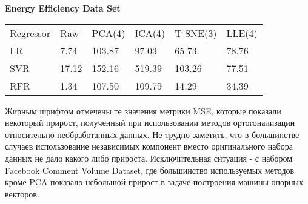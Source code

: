 \documentclass[runningheads]{llncs}
\begin{document}
\textbf{Energy Efficiency Data Set}
\begin{table}[H]
\begin{tabular}{llllll}
Regressor                 & Raw  & PCA(4) & ICA(4) & T-SNE(3) & LLE(4) \\
LR         & 7.74 & 103.87  & 97.03   & 65.73 & 78.76 \\
SVR & 17.12 & 152.16  & 519.39  & 103.26  & 77.51  \\
RFR   & 1.34 & 107.50  & 109.79  & 14.29  & 34.39  
\end{tabular}
\end{table}

Жирным шрифтом отмечены те значения метрики MSE, которые показали некоторый прирост, полученный при использовании методов ортогонализации относительно необработанных данных. Не трудно заметить, что в большинстве случаев использование независимых компонент вместо оригинального набора данных не дало какого либо прироста. Исключительная ситуация - с набором Facebook Comment Volume Dataset, где большинство используемых методов кроме PCA показало небольшой прирост в задаче построения машины опорных векторов.

\newpage
\end{document}
